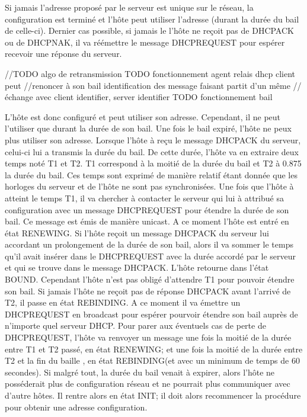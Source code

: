 Si jamais l'adresse proposé par le serveur est unique sur le réseau, la
configuration est terminé et l'hôte peut utiliser l'adresse (durant la durée du
bail de celle-ci).  Dernier cas possible, si jamais le l'hôte ne reçoit pas de
DHCPACK ou de DHCPNAK, il va réémettre le message DHCPREQUEST pour espérer
recevoir une réponse du serveur.

//TODO algo de retransmission TODO fonctionnement agent relais dhcp client peut
//renoncer à son bail identification des message faisant partit d'un même
//échange avec client identifier, server identifier TODO fonctionnement bail

L'hôte est donc configuré et peut utiliser son adresse. Cependant, il ne peut
l'utiliser que durant la durée de son bail. Une fois le bail expiré, l'hôte ne
peux plus utiliser son adresse. Lorsque l'hôte à reçu le message DHCPACK du
serveur, celui-ci lui a transmis la durée du bail. De cette durée, l'hôte va
en extraire deux temps noté T1 et T2. T1 correspond à la moitié de la durée du
bail et T2 à 0.875 la durée du bail. Ces temps sont exprimé de manière relatif
étant donnée que les horloges du serveur et de l'hôte ne sont pas
synchronisées.  Une fois que l'hôte à atteint le temps T1, il va chercher à
contacter le serveur qui lui à attribué sa configuration avec un message
DHCPREQUEST pour étendre la durée de son bail. Ce message est émis de manière
unicast. A ce moment l'hôte est entré en état RENEWING. Si l'hôte reçoit un
message DHCPACK du serveur lui accordant un prolongement de la durée de son
bail, alors il va sommer le temps qu'il avait insérer dans le DHCPREQUEST avec
la durée accordé par le serveur et qui se trouve dans le message DHCPACK.
L'hôte retourne dans l'état BOUND. Cependant l'hôte n'est pas obligé d'attendre
T1 pour pouvoir étendre son bail.  Si jamais l'hôte ne reçoit pas de réponse
DHCPACK avant l'arrivé de T2, il passe en état REBINDING. A ce moment il va
émettre un DHCPREQUEST en broadcast pour espérer pourvoir étendre son bail
auprès de n'importe quel serveur DHCP. Pour parer aux éventuels cas de perte de
DHCPREQUEST, l'hôte va renvoyer un message une fois la moitié de la durée entre
T1 et T2 passé, en état RENEWING; et une fois la moitié de la durée entre T2 et
la fin du baille , en état REBINDING(et avec un minimum de temps de 60
secondes).  Si malgré tout, la durée du bail venait à expirer, alors l'hôte ne
posséderait plus de configuration réseau et ne pourrait plus communiquer avec
d'autre hôtes. Il rentre alors en état INIT; il doit alors recommencer la
procédure pour obtenir une adresse configuration.

